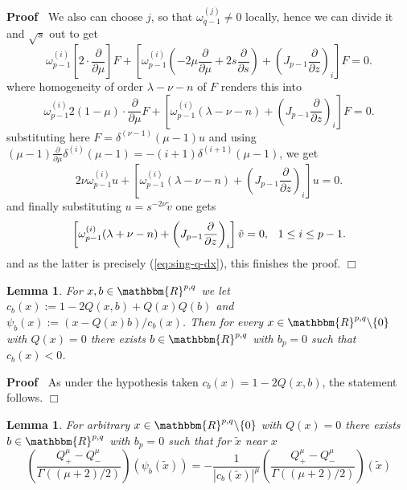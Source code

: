 \documentclass[12pt]{article}
\newcommand{\assign}{:=}
\renewenvironment{proof}{\noindent\textbf{Proof\ }}{\hspace*{\fill}$\Box$\medskip}
\newtheorem{lemma}[proposition]{Lemma}
\theoremstyle{remark}
\begin{document}
\begin{proof}
  We also can choose $j$, so that $\omega^{(j)}_{q - 1} \neq 0$ locally, hence
  we can divide it and $\sqrt{s}$ out to get
  \[ \omega^{(i)}_{p - 1}  \left[ 2 \cdot \frac{\partial}{\partial \mu}
     \right] F + \left[ \omega_{p - 1}^{(i)}  \left( - 2 \mu
     \frac{\partial}{\partial \mu} + 2 s \frac{\partial}{\partial s} \right) +
     \left( J_{p - 1}  \frac{\partial}{\partial z} \right)_i \right] F = 0. \]
  where homogeneity of order $\lambda - \nu - n$ of $F$ renders this into
  \[ \omega^{(i)}_{p - 1} 2 (1 - \mu) \cdot \frac{\partial}{\partial \mu} F +
     \left[ \omega_{p - 1}^{(i)}  (\lambda - \nu - n) + \left( J_{p - 1} 
     \frac{\partial}{\partial z} \right)_i \right] F = 0. \]
  substituting here $F = \delta^{(\nu - 1)}  (\mu - 1) u$ and using $(\mu - 1)
  \frac{\partial}{\partial \mu} \delta^{(i)}  (\mu - 1) = - (i + 1)
  \delta^{(i + 1)}  (\mu - 1)$, we get
  \[ 2 \nu \omega^{(i)}_{p - 1} u + \left[ \omega_{p - 1}^{(i)}  (\lambda -
     \nu - n) + \left( J_{p - 1}  \frac{\partial}{\partial z} \right)_i
     \right] u = 0. \]
  and finally substituting $u = s^{- 2 \nu}  \tilde{v}$ one gets
  \[ \left[ \omega_{p - 1}^{(i)}  (\lambda + \nu - n) + \left( J_{p - 1} 
     \frac{\partial}{\partial z} \right)_i \right]  \tilde{v} = 0,
     \hspace{0.75em} 1 \leq i \leq p - 1. \]
  and as the latter is precisely (\ref{eq:sing-q-dx}), this finishes the
  proof.
\end{proof}

\begin{lemma}
  \label{supp-Q:lem-flip}For $x, b \in \mathbbm{R}^{p, q}$ we let $c_b (x)
  \assign 1 - 2 Q (x, b) + Q (x) Q (b)$ and $\psi_b (x) \assign (x - Q (x) b)
  / c_b (x)$. Then for every $x \in \mathbbm{R}^{p, q} \backslash \{ 0 \}$
  with $Q (x) = 0$ there exists $b \in \mathbbm{R}^{p, q}$ with $b_p = 0$ such
  that $c_b (x) < 0$.
\end{lemma}

\begin{proof}
  As under the hypothesis taken $c_b (x) = 1 - 2 Q (x, b)$, the statement
  follows.
\end{proof}

\begin{lemma}
  \label{supp-Q:lem-sing-q-7-aux}For arbitrary $x \in \mathbbm{R}^{p, q}
  \backslash \{ 0 \}$ with $Q (x) = 0$ there exists $b \in \mathbbm{R}^{p, q}$
  with $b_p = 0$ such that for $\tilde{x}$ near $x$
  \[ \left( \frac{Q_+^{\mu} - Q_-^{\mu}}{\Gamma ((\mu + 2) / 2)} \right)
     (\psi_b (\tilde{x})) = - \frac{1}{| c_b (\tilde{x}) |^{\mu}} \left(
     \frac{Q_+^{\mu} - Q_-^{\mu}}{\Gamma ((\mu + 2) / 2)} \right) (\tilde{x})
  \]
\end{lemma}
\end{document}

